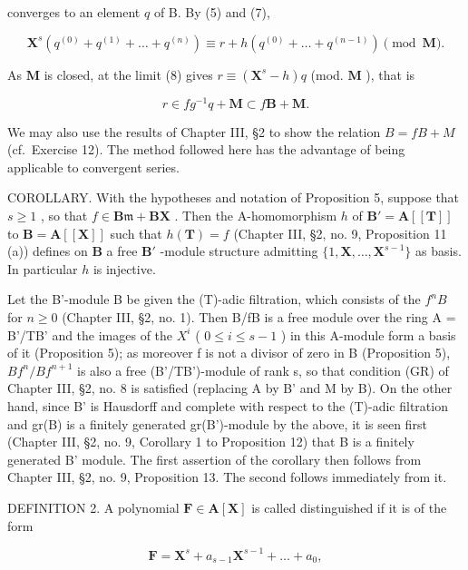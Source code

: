 converges to an element \(q\) of B. By (5) and (7),

\[
\mathbf {X} ^ {s} (q ^ {(0)} + q ^ {(1)} + \dots + q ^ {(n)}) \equiv r + h (q ^ {(0)} + \dots + q ^ {(n - 1)}) \pmod {\mathbf {M}}. \tag {8}
\]

As \(\mathbf{M}\) is closed, at the limit (8) gives \(r \equiv (\mathbf{X}^s - h)q\) (mod. \(\mathbf{M}\) ), that is

\[
r \in f g ^ {- 1} q + \mathbf {M} \subset f \mathbf {B} + \mathbf {M}.
\]

We may also use the results of Chapter III, §2 to show the relation \(B = fB + M\) (cf.~Exercise 12). The method followed here has the advantage of being applicable to convergent series.

COROLLARY. With the hypotheses and notation of Proposition 5, suppose that \(s \geqslant 1\) , so that \(f \in \mathbf{B}\mathfrak{m} + \mathbf{B}\mathbf{X}\) . Then the A-homomorphism \(h\) of \(\mathbf{B}' = \mathbf{A}[[\mathbf{T}]]\) to \(\mathbf{B} = \mathbf{A}[[\mathbf{X}]]\) such that \(h(\mathbf{T}) = f\) (Chapter III, §2, no. 9, Proposition 11 (a)) defines on \(\mathbf{B}\) a free \(\mathbf{B}'\) -module structure admitting \(\{1, \mathbf{X}, \ldots, \mathbf{X}^{s-1}\}\) as basis. In particular \(h\) is injective.

Let the B'-module B be given the (T)-adic filtration, which consists of the \(f^{n}B\) for \(n \geqslant 0\) (Chapter III, §2, no. 1). Then B/fB is a free module over the ring A = B'/TB' and the images of the \(X^{i}\) ( \(0 \leqslant i \leqslant s - 1\) ) in this A-module form a basis of it (Proposition 5); as moreover f is not a divisor of zero in B (Proposition 5), \(Bf^{n}/Bf^{n+1}\) is also a free (B'/TB')-module of rank s, so that condition (GR) of Chapter III, §2, no. 8 is satisfied (replacing A by B' and M by B). On the other hand, since B' is Hausdorff and complete with respect to the (T)-adic filtration and gr(B) is a finitely generated gr(B')-module by the above, it is seen first (Chapter III, §2, no. 9, Corollary 1 to Proposition 12) that B is a finitely generated B' module. The first assertion of the corollary then follows from Chapter III, §2, no. 9, Proposition 13. The second follows immediately from it.

DEFINITION 2. A polynomial \(\mathbf{F} \in \mathbf{A}[\mathbf{X}]\) is called distinguished if it is of the form

\[
\mathbf {F} = \mathbf {X} ^ {s} + a _ {s - 1} \mathbf {X} ^ {s - 1} + \dots + a _ {0},
\]

